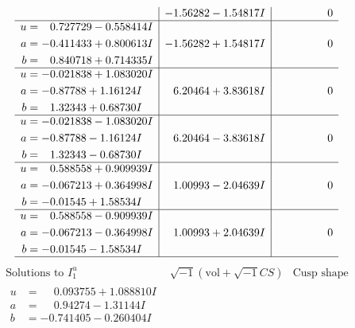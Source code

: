 \documentclass[1p]{elsarticle_modified}
\theoremstyle{definition}
\newcommand{\I}{\sqrt{-1}}
\begin{document}
$$\begin{array}{c|c|c}
 & -1.56282 - 1.54817 I & \phantom{-0.000000 } 0 \\ \hline\begin{aligned}
u &= \phantom{-}0.727729 - 0.558414 I \\
a &= -0.411433 + 0.800613 I \\
b &= \phantom{-}0.840718 + 0.714335 I\end{aligned}
 & -1.56282 + 1.54817 I & \phantom{-0.000000 } 0 \\ \hline\begin{aligned}
u &= -0.021838 + 1.083020 I \\
a &= -0.87788 + 1.16124 I \\
b &= \phantom{-}1.32343 + 0.68730 I\end{aligned}
 & \phantom{-}6.20464 + 3.83618 I & \phantom{-0.000000 } 0 \\ \hline\begin{aligned}
u &= -0.021838 - 1.083020 I \\
a &= -0.87788 - 1.16124 I \\
b &= \phantom{-}1.32343 - 0.68730 I\end{aligned}
 & \phantom{-}6.20464 - 3.83618 I & \phantom{-0.000000 } 0 \\ \hline\begin{aligned}
u &= \phantom{-}0.588558 + 0.909939 I \\
a &= -0.067213 + 0.364998 I \\
b &= -0.01545 + 1.58534 I\end{aligned}
 & \phantom{-}1.00993 - 2.04639 I & \phantom{-0.000000 } 0 \\ \hline\begin{aligned}
u &= \phantom{-}0.588558 - 0.909939 I \\
a &= -0.067213 - 0.364998 I \\
b &= -0.01545 - 1.58534 I\end{aligned}
 & \phantom{-}1.00993 + 2.04639 I & \phantom{-0.000000 } 0\\
 \hline 
 \end{array}$$\newpage$$\begin{array}{c|c|c}  
\text{Solutions to }I^u_{1}& \I (\text{vol} + \sqrt{-1}CS) & \text{Cusp shape}\\
 \hline 
\begin{aligned}
u &= \phantom{-}0.093755 + 1.088810 I \\
a &= \phantom{-}0.94274 - 1.31144 I \\
b &= -0.741405 - 0.260404 I\end{aligned}

\end{array}$$
\end{document}
